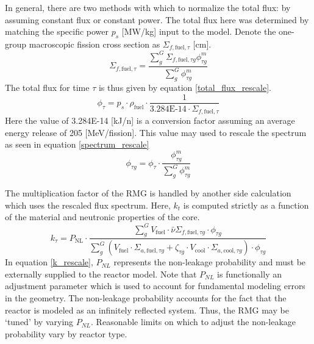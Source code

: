 In general, there are two methods with which to normalize the total flux: by assuming constant flux
or constant power.  The total flux here was determined by matching the specific power $p_s$ [MW/kg] 
input to the model.  Denote the one-group macroscopic 
fission cross section as $\Sigma_{f,\mbox{fuel},\tau}$ [cm].
\begin{equation}
\label{one_group_fission}
\Sigma_{f,\mbox{fuel},\tau} = \frac{\sum_g^G \Sigma_{f,\mbox{fuel},\tau g}\phi_{\tau g}^m}
                                   {\sum_g^G \phi_{\tau g}^m}
\end{equation}
The total flux for time $\tau$ is thus given by equation \ref{total_flux_rescale}.
\begin{equation}
\label{total_flux_rescale}
\phi_{\tau} = p_s \cdot  \rho_{\mbox{fuel}} \cdot \frac{1}
                                                       {\mbox{3.284E-14} \cdot \Sigma_{f,\mbox{fuel},\tau}}
\end{equation}
Here the value of 3.284E-14 [kJ/n] is a conversion factor assuming an average 
energy release of 205 [MeV/fission].  This value may used to rescale the spectrum 
as seen in equation \ref{spectrum_rescale}
\begin{equation}
\label{spectrum_rescale}
\phi_{\tau g} = \phi_{\tau} \cdot  \frac{\phi_{\tau g}^m}
                                        {\sum_g^G \phi_{\tau g}^m}
\end{equation}

The multiplication factor of the RMG is handled by another side calculation which 
uses the rescaled flux spectrum.  Here, $k_t$ is computed strictly as a function of the 
material and neutronic properties of the core.
\begin{equation}
\label{k_rescale}
k_{\tau} = P_{\mbox{NL}} \cdot \frac{\sum_g^G V_{\mbox{fuel}} \cdot \bar{\nu}\Sigma_{f,\mbox{fuel},\tau g} \cdot \phi_{\tau g}}
                                    {\sum_g^G \left(V_{\mbox{fuel}} \cdot \Sigma_{a,\mbox{fuel},\tau g} + \zeta_{\tau g} \cdot V_{\mbox{cool}} \cdot \Sigma_{a,\mbox{cool},\tau g}\right) \cdot  \phi_{\tau g}}
\end{equation}
In equation \ref{k_rescale}, $P_{NL}$ represents the non-leakage probability and must be externally supplied
to the reactor model.  Note that $P_{NL}$ is functionally an adjustment parameter
which is used to account for fundamental modeling errors in the geometry.  The non-leakage 
probability accounts for the fact that the reactor is modeled as an infinitely reflected system.
Thus, the RMG may be `tuned'
by varying $P_{NL}$.  Reasonable limits on which to adjust the non-leakage probability
vary by reactor type.  


